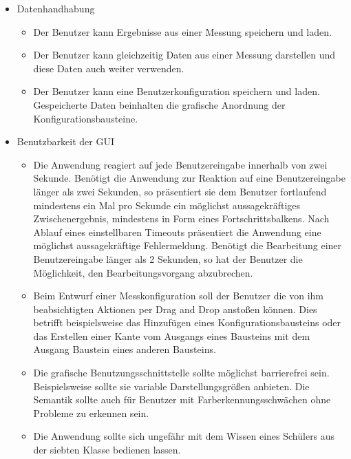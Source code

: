 \documentclass[parskip=full]{scrartcl}
\begin{document}
\begin{itemize}

\item Datenhandhabung
\begin{itemize}

\item Der Benutzer kann Ergebnisse aus einer Messung speichern und laden.
\item Der Benutzer kann gleichzeitig Daten aus einer Messung darstellen und diese Daten auch weiter verwenden.
\item Der Benutzer kann eine \gls{Benutzerkonfiguration} speichern und laden. Gespeicherte Daten beinhalten die grafische Anordnung der Konfigurationsbausteine. 


\end{itemize}



\item Benutzbarkeit der GUI
\begin{itemize}

\item Die Anwendung reagiert auf jede Benutzereingabe innerhalb von zwei Sekunde. 
Benötigt die Anwendung zur Reaktion auf eine Benutzereingabe länger als zwei Sekunden, so präsentiert sie dem Benutzer fortlaufend mindestens ein Mal pro Sekunde ein möglichst aussagekräftiges Zwischenergebnis, mindestens in Form eines Fortschrittsbalkens. 
Nach Ablauf eines einstellbaren Timeouts präsentiert die Anwendung eine möglichst aussagekräftige Fehlermeldung. Benötigt die Bearbeitung einer Benutzereingabe länger als 2 Sekunden, so hat der Benutzer die Möglichkeit, den Bearbeitungsvorgang abzubrechen. 
\item Beim Entwurf einer Messkonfiguration soll der Benutzer die von ihm beabsichtigten Aktionen per Drag and Drop anstoßen können. Dies betrifft beispielsweise das Hinzufügen eines Konfigurationsbausteins oder das Erstellen einer Kante vom Ausgangs eines Bausteins mit dem Ausgang Baustein eines anderen Bausteins.
\item Die grafische Benutzungsschnittstelle sollte möglichst barrierefrei sein. Beispielsweise sollte sie variable Darstellungsgrößen anbieten. Die Semantik sollte auch für Benutzer mit Farberkennungsschwächen ohne Probleme zu erkennen sein.
\item Die Anwendung sollte sich ungefähr mit dem Wissen eines Schülers aus der siebten Klasse bedienen lassen.

\end{itemize}


\end{itemize}
\end{document}
